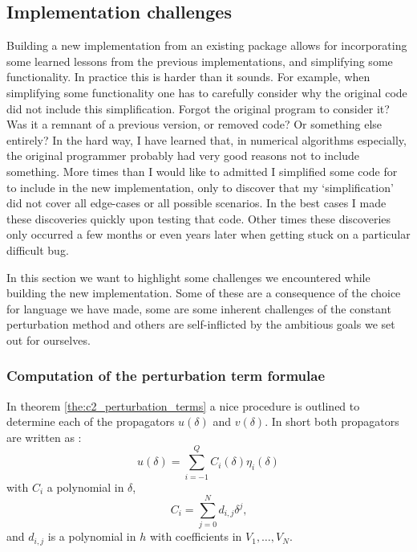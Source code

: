 \subsection{Implementation challenges}

Building a new implementation from an existing package allows for incorporating some learned lessons from the previous implementations, and simplifying some functionality.  In practice this is harder than it sounds. For example, when simplifying some functionality one has to carefully consider why the original code did not include this simplification. Forgot the original program to consider it? Was it a remnant of a previous version, or removed code? Or something else entirely? In the hard way, I have learned that, in numerical algorithms especially, the original programmer probably had very good reasons not to include something. More times than I would like to admitted I simplified some code for  to include in the new implementation, only to discover that my `simplification' did not cover all edge-cases or all possible scenarios. In the best cases I made these discoveries quickly upon testing that code. Other times these discoveries only occurred a few months or even years later when getting stuck on a particular difficult bug.

In this section we want to highlight some challenges we encountered while building the new implementation. Some of these are a consequence of the choice for language we have made, some are some inherent challenges of the constant perturbation method and others are self-inflicted by the ambitious goals we set out for ourselves.



\subsubsection{Computation of the perturbation term formulae}

In theorem \ref{the:c2_perturbation_terms} a nice procedure is outlined to determine each of the propagators $u(\delta)$ and $v(\delta)$. In short both propagators are written as :
$$
    u(\delta) = \sum_{i = -1}^{Q} C_i(\delta) \eta_{i}(\delta)
$$
with $C_i$ a polynomial in $\delta$,
\begin{equation}\label{equ:c2_symbolic_propagators}
    C_i  = \sum_{j=0}^{N} d_{i, j} \delta^j\text{,}
\end{equation}
and $d_{i, j}$ is a polynomial in $h$ with coefficients in $V_1, \dots, V_{N}$.

